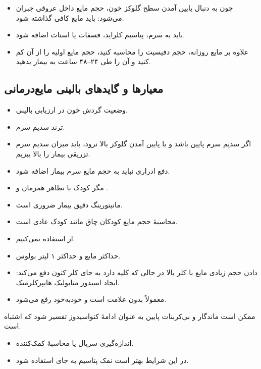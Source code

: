 \documentclass[12pt,a4paper]{article}
\begin{document}
\begin{itemize}
\item چون به دنبال پایین آمدن سطح گلوکز خون، حجم مایع داخل عروقی جبران می‌شود: باید مایع  کافی گذاشته شود.
\item باید به سرم، پتاسیم کلراید، فسفات یا استات اضافه شود.
\item علاوه بر مایع  روزانه، حجم دفیسیت را محاسبه کنید، حجم مایع اولیه را از آن کم کنید و آن را طی ۲۴–۴۸ ساعت به بیمار بدهید.
\end{itemize}
\subsection*{معیارها و گایدهای بالینی مایع‌درمانی}
\begin{itemize}
\item وضعیت گردش خون در ارزیابی بالینی.
\item ترند سدیم سرم.
\item اگر سدیم سرم پایین باشد و با پایین آمدن گلوکز بالا نرود، باید میزان سدیم سرم تزریقی بیمار را بالا ببریم.
\item دفع ادراری نباید به حجم مایع سرم بیمار اضافه شود.
\item مگر کودک با تظاهر همزمان  و .
\item مانیتورینگ دقیق  بیمار ضروری است.
\item محاسبهٔ حجم مایع کودکان چاق مانند کودک عادی است.
\item از  استفاده نمی‌کنیم.
\item حداکثر  مایع و حداکثر ۱ لیتر بولوس.
\item دادن حجم زیادی مایع با کلر بالا در حالی که کلیه دارد به جای کلر کتون دفع می‌کند: ایجاد اسیدوز متابولیک هایپرکلرمیک.
\item معمولاً بدون علامت است و خودبه‌خود رفع می‌شود.
\end{itemize}

ممکن است  ماندگار و بی‌کربنات پایین به عنوان ادامهٔ کتواسیدوز تفسیر شود که اشتباه است.
\begin{itemize}
\item اندازه‌گیری سریال  یا محاسبهٔ  کمک‌کننده.
\item در این شرایط بهتر است نمک پتاسیم به جای  استفاده شود.
\end{itemize}
\end{document}

